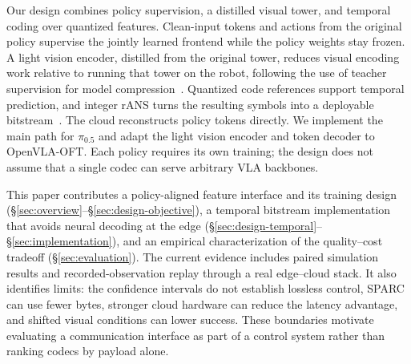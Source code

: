 Our design combines policy supervision, a distilled visual tower, and
temporal coding over quantized features. Clean-input tokens and actions
from the original policy supervise the jointly learned frontend while
the policy weights stay frozen. A light vision encoder, distilled from the
original tower, reduces visual encoding work relative to running that
tower on the robot,
following the use of teacher supervision
for model compression~\cite{distillation}. Quantized code references
support temporal prediction, and integer rANS turns the resulting symbols
into a deployable bitstream~\cite{ans}. The cloud reconstructs policy
tokens directly. We implement the main path for $\pi_{0.5}$ and adapt
the light vision encoder and token decoder to OpenVLA-OFT. Each policy requires
its own training; the design does not assume that a single codec can
serve arbitrary VLA backbones.

This paper contributes a policy-aligned feature interface and its
training design (\S\ref{sec:overview}--\S\ref{sec:design-objective}), a
temporal bitstream implementation that avoids neural decoding at the
edge (\S\ref{sec:design-temporal}--\S\ref{sec:implementation}), and an
empirical characterization of the quality--cost tradeoff
(\S\ref{sec:evaluation}). The current evidence includes paired simulation
results and recorded-observation replay through a real edge--cloud stack.
It also identifies limits: the confidence intervals do not establish
lossless control, SPARC can use fewer bytes, stronger cloud hardware can
reduce the latency advantage, and shifted visual conditions can lower
success. These boundaries motivate evaluating a communication interface
as part of a control system rather than ranking codecs by payload alone.
